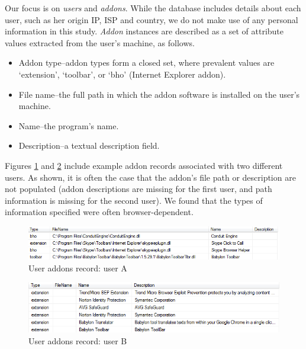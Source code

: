 \documentclass[ijoc,nonblindrev]{informs3} %
\numberwithin{equation}{subsection}
\begin{document}
Our focus is on {\it users} and {\it addons}. While the database includes details about each user, such as her origin IP, ISP and country, we do not make use of any personal information in this study. {\it Addon} instances are described as a set of attribute values extracted from the user's machine, as follows.
\begin{itemize}
\item Addon type--addon types form a closed set, where prevalent values are `extension', `toolbar', or `bho' (Internet Explorer addon).
\item File name--the full path in which the addon software is installed on the user's machine. 
\item Name--the program's name. 
\item Description--a textual description field. 
\end{itemize}
Figures \ref{fig:db_addons_snapshot} and \ref{fig:db_addons_snapshot_desc} include example addon records associated with two different users. As shown, it is often the case that the addon's file path or description are not populated (addon descriptions are missing for the first user, and path information is missing for the second user). We found that the types of information specified were often browser-dependent. 

\begin{figure}[t]
\centering
\begin{small}
\includegraphics[scale=.8,angle=0]{figures/db_addons_snapshot.png}
\end{small}
\caption{User addons record: user A}
\label{fig:db_addons_snapshot}
\end{figure}

\begin{figure}[t]
\centering
\begin{small}
\includegraphics[scale=.8,angle=0]{figures/db_addons_snapshot_desc.png}
\end{small}
\caption{User addons record: user B}
\label{fig:db_addons_snapshot_desc}
\end{figure}
\end{document}
